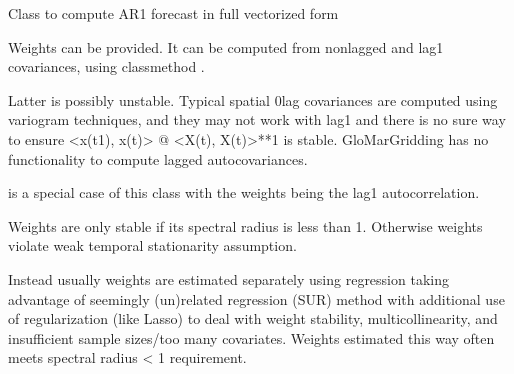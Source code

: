 \documentclass[letterpaper,10pt,english]{sphinxmanual}
\begin{document}

\begin{fulllineitems}
\label{\detokenize{kalman:glomar_gridding.autoregressive_kalman.Autoregressive1ForecastVector}}
\pysigstartsignatures
\pysiglinewithargsret
{}
{\sphinxparamcomma {}\sphinxparamcomma {}\sphinxparamcomma {}\sphinxparamcomma {}\sphinxparamcomma {}}
{}
\pysigstopsignatures
\sphinxAtStartPar
Class to compute AR1 forecast in full vectorized form

\sphinxAtStartPar
Weights can be provided. It can be computed from non\sphinxhyphen{}lagged and
lag\sphinxhyphen{}1 covariances, using classmethod .

\sphinxAtStartPar
Latter is possibly unstable. Typical spatial 0\sphinxhyphen{}lag covariances
are computed using variogram techniques, and they may not
work with lag\sphinxhyphen{}1 and there is no sure way to ensure
\textless{}x(t\sphinxhyphen{}1), x(t)\textgreater{} @ \textless{}X(t), X(t)\textgreater{}**\sphinxhyphen{}1 is stable. GloMarGridding has no
functionality to compute lagged autocovariances.

\sphinxAtStartPar
{} is a special case of this class with
the weights being the lag\sphinxhyphen{}1 autocorrelation.

\sphinxAtStartPar
Weights are only stable if its spectral radius is less than 1. Otherwise
weights violate weak temporal stationarity assumption.

\sphinxAtStartPar
Instead usually weights are estimated separately using regression taking
advantage of seemingly (un)related regression (SUR) method with additional
use of regularization (like Lasso) to deal with weight stability,
multicollinearity, and insufficient sample sizes/too many covariates.
Weights estimated this way often meets spectral radius \textless{} 1 requirement.


\end{fulllineitems}
\end{document}
